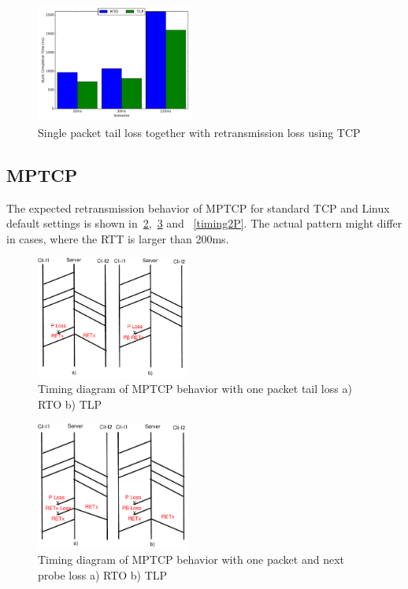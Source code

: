 \documentclass[10pt,draftcls,twocolumn]{IEEEconf}
\begin{document}
\begin{figure}[!ht]
\begin{center}
\includegraphics[angle=0, width=0.46\textwidth, natwidth=578.16,natheight=433.62]{plots/T1PP.pdf}
\caption{Single packet tail loss together with retransmission loss using TCP}\label{t1pp}
\end{center}
\end{figure}

\subsection{MPTCP}


The expected retransmission behavior of MPTCP for standard TCP and Linux default settings is shown 
in~\ref{timing1P},~\ref{timing1PP} and ~\ref{timing2P}. The actual pattern might differ in cases,
where the RTT is larger than 200ms. 

\begin{figure}[!ht]
\begin{center}
\includegraphics[angle=0, width=0.45\textwidth, natwidth=610, natheight=400]{images/timing1P.pdf}
\end{center}
\caption{Timing diagram of MPTCP behavior with one packet tail loss a) RTO b) TLP}\label{timing1P}
\end{figure}

\begin{figure}[!ht]
\begin{center}
\includegraphics[angle=0, width=0.45\textwidth, natwidth=610, natheight=400]{images/timing1PP.pdf}
\end{center}
\caption{Timing diagram of MPTCP behavior with one packet and next probe loss a) RTO b) TLP}\label{timing1PP}
\end{figure}
\end{document}
